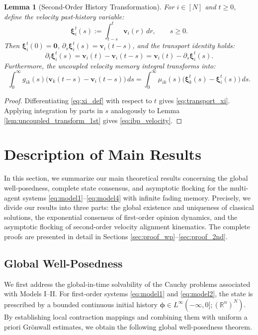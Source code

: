 \documentclass[11pt]{amsart}
\newtheorem{lemma}{Lemma}[section]
\numberwithin{equation}{section}
\begin{document}
\begin{lemma}[Second-Order History Transformation]\label{lem:uncoupled_transform_2nd}
For $i \in [N]$ and $t \ge 0$, define the velocity past-history variable:
\begin{equation} \label{eq:xi_def}
\boldsymbol{\xi}_i^t(s) := \int_{t-s}^{t} \boldsymbol{v}_i(r)\,dr, \qquad s \ge 0.
\end{equation}
Then $\boldsymbol{\xi}_i^t(0) = \mathbf{0}$, $\partial_s \boldsymbol{\xi}_i^t(s) = \boldsymbol{v}_i(t-s)$, and the transport identity holds:
\begin{equation}\label{eq:transport_xi}
\partial_t \boldsymbol{\xi}_i^t(s) = \boldsymbol{v}_i(t) - \boldsymbol{v}_i(t-s) = \boldsymbol{v}_i(t) - \partial_s \boldsymbol{\xi}_i^t(s).
\end{equation}
Furthermore, the uncoupled velocity memory integral transforms into:
\begin{equation}\label{eq:ibp_velocity}
\int_{0}^{\infty} g_{ik}(s)\bigl(\boldsymbol{v}_k(t-s)-\boldsymbol{v}_i(t-s)\bigr)\,ds = \int_0^\infty \mu_{ik}(s)\bigl(\boldsymbol{\xi}_k^t(s)-\boldsymbol{\xi}_i^t(s)\bigr)\,ds.
\end{equation}
\end{lemma}

\begin{proof}
Differentiating \eqref{eq:xi_def} with respect to $t$ gives \eqref{eq:transport_xi}. Applying integration by parts in $s$ analogously to Lemma \ref{lem:uncoupled_transform_1st} gives \eqref{eq:ibp_velocity}.
\end{proof}


\section{Description of Main Results}\label{sec:main_result}
In this section, we summarize our main theoretical results concerning the global well-posedness, complete state consensus, and asymptotic flocking for the multi-agent systems \eqref{eq:model1}--\eqref{eq:model4} with infinite fading memory. Precisely, we divide our results into three parts: the global existence and uniqueness of classical solutions, the exponential consensus of first-order opinion dynamics, and the asymptotic flocking of second-order velocity alignment kinematics. The complete proofs are presented in detail in Sections \ref{sec:proof_wp}--\ref{sec:proof_2nd}.

\subsection{Global Well-Posedness}
We first address the global-in-time solvability of the Cauchy problems associated with Models I--II. For first-order systems \eqref{eq:model1} and \eqref{eq:model2}, the state is prescribed by a bounded continuous initial history $\boldsymbol{\phi} \in L^\infty(-\infty, 0]; (\mathbb{R}^n)^N)$. By establishing local contraction mappings and combining them with uniform a priori Gr\"onwall estimates, we obtain the following global well-posedness theorem.
\end{document}
